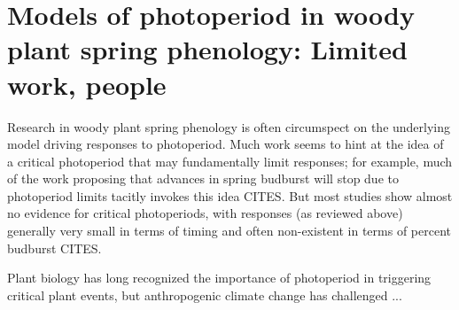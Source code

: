 \documentclass[11pt]{article}
\begin{document}
\section*{Models of photoperiod in woody plant spring phenology: Limited work, people} %

Research in woody plant spring phenology is often circumspect on the underlying model driving responses to photoperiod. Much work seems to hint at the idea of a critical photoperiod that may fundamentally limit responses; for example, much of the work proposing that advances in spring budburst will stop due to photoperiod limits tacitly invokes this idea CITES. But most studies show almost no evidence for critical photoperiods, with responses (as reviewed above) generally very small in terms of timing and often non-existent in terms of percent budburst CITES. 

Plant biology has long recognized the importance of photoperiod in triggering critical plant events, but anthropogenic climate change has challenged ... 
\end{document}
